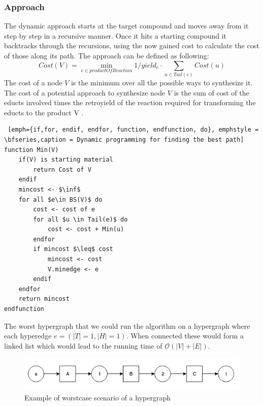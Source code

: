 \documentclass[a4paper,10pt,titlepage]{paper}
\begin{document}
\subsubsection{Approach}
The dynamic approach starts at the target compound and moves away from it step by step in a recursive manner. Once it hits a starting compound it backtracks through the recursions, using the now gained cost to calculate the cost of those along its path. The approach can be defined as following:
\begin{equation}
Cost(V) = \displaystyle\min_{e\in productOfReaction} 1/yield_e \cdot \displaystyle\sum_{u\in Tail(e)} Cost(u)
\end{equation}
The cost of a node $V$ is the minimum over all the possible ways to synthesize it. The cost of a potential approach to synthesize node $V$ is the sum of cost of the educts involved times the retroyield of the reaction required for transforming the educts to the product V .\cite{Carsten}
	
\begin{lstlisting} [emph={if,for, endif, endfor, function, endfunction, do}, emphstyle = \bfseries,caption = Dynamic programming for finding the best path]
function Min(V)
	if(V) is starting material 
		return Cost of V
	endif
	mincost <- $\inf$
	for all $e\in BS(V)$ do
		cost <- cost of e
		for all $u \in Tail(e)$ do
			cost <- cost + Min(u)
		endfor
		if mincost $\leq$ cost 
			mincost <- cost
			V.minedge <- e
		endif
	endfor
	return mincost
endfunction
\end{lstlisting}

The worst hypergraph that we could run the algorithm on a hypergraph where each hyperedge $e=(|T| = 1, |H| = 1)$. When connected these would form a linked list which would lead to the running time of $\mathcal{O}(|V|+|E|)$. 
\begin{figure}[H]
\centering
\includegraphics[scale=0.5]{Billeder/WorstCaseDynamic.png}
\caption{Example of worstcase scenario of a hypergraph}
\end{figure}
\end{document}
